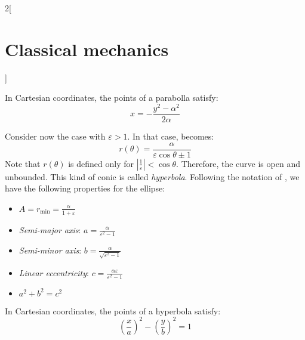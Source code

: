 \documentclass[../../../main_physics.tex]{subfiles}
\begin{document}
\begin{multicols}{2}[\section{Classical mechanics}]
\begin{definition}[Parabolla: $\varepsilon=1$]
    In Cartesian coordinates, the points of a parabolla satisfy: $$x=-\frac{y^2-\alpha^2}{2\alpha}$$
  \end{definition}
  \begin{definition}
    Consider now the case with $\varepsilon>1$. In that case,  becomes: $$r(\theta)=\frac{\alpha}{\varepsilon\cos\theta\pm 1}$$ Note that $r(\theta)$ is defined only for $\left|\frac{1}{\varepsilon}\right|<\cos\theta$. Therefore, the curve is open and unbounded. This kind of conic is called \emph{hyperbola}.
    Following the notation of , we have the following properties for the ellipse:
    \begin{itemize}
      \item $\displaystyle A=r_\text{min}=\frac{\alpha}{1+\varepsilon}$
      \item \emph{Semi-major axis}: $\displaystyle a=\frac{\alpha}{\varepsilon^2-1}$
      \item \emph{Semi-minor axis}: $\displaystyle b=\frac{\alpha}{\sqrt{\varepsilon^2-1}}$
      \item \emph{Linear eccentricity}: $\displaystyle c=\frac{\alpha\varepsilon}{\varepsilon^2-1}$
      \item $a^2+b^2=c^2$
    \end{itemize}
    \begin{center}
      \begin{minipage}{\linewidth}
        \centering
        
        \label{CM_hyperbola}
      \end{minipage}
    \end{center}
    In Cartesian coordinates, the points of a hyperbola satisfy: $${\left(\frac{x}{a}\right)}^2-{\left(\frac{y}{b}\right)}^2=1$$
  \end{definition}

\end{multicols}
\end{document}
